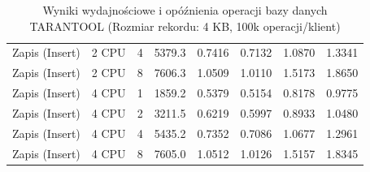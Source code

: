 \begin{table}[ht]
{\begin{tabular}{llcrrrrr}
Zapis (Insert) & 2 CPU & 4 & 5379.3 & 0.7416 & 0.7132 & 1.0870 & 1.3341 \\
Zapis (Insert) & 2 CPU & 8 & 7606.3 & 1.0509 & 1.0110 & 1.5173 & 1.8650 \\
Zapis (Insert) & 4 CPU & 1 & 1859.2 & 0.5379 & 0.5154 & 0.8178 & 0.9775 \\
Zapis (Insert) & 4 CPU & 2 & 3211.5 & 0.6219 & 0.5997 & 0.8933 & 1.0480 \\
Zapis (Insert) & 4 CPU & 4 & 5435.2 & 0.7352 & 0.7086 & 1.0677 & 1.2961 \\
Zapis (Insert) & 4 CPU & 8 & 7605.0 & 1.0512 & 1.0126 & 1.5157 & 1.8345 \\
\bottomrule
\end{tabular}%
}
\caption{Wyniki wydajnościowe i opóźnienia operacji bazy danych TARANTOOL (Rozmiar rekordu: 4 KB, 100k operacji/klient)}
\label{tab:latency_tarantool_medium_100000}
\end{table}
